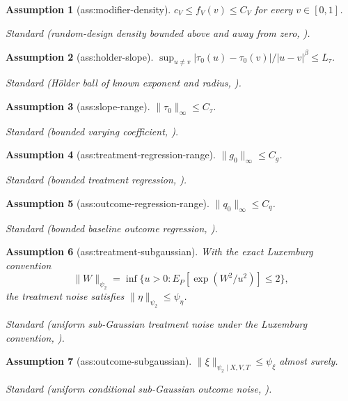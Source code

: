 \documentclass{article}
\newtheorem{assumption}{Assumption}
\begin{document}
\begin{assumption}[ass:modifier-density]\label{ass:modifier-density}
\(c_V\le f_V(v)\le C_V\) for every \(v\in[0,1]\).
\par\smallskip\noindent\emph{Standard} (random-design density bounded above and away from zero, \cite{LeeOkuiWhang2017}).
\end{assumption}

\begin{assumption}[ass:holder-slope]\label{ass:holder-slope}
\(\sup_{u\ne v}|\tau_0(u)-\tau_0(v)|/|u-v|^\beta\le L_\tau\).
\par\smallskip\noindent\emph{Standard} (Hölder ball of known exponent and radius, \cite{Low1997}).
\end{assumption}

\begin{assumption}[ass:slope-range]\label{ass:slope-range}
\(\|\tau_0\|_\infty\le C_\tau\).
\par\smallskip\noindent\emph{Standard} (bounded varying coefficient, \cite{FanZhang2000}).
\end{assumption}

\begin{assumption}[ass:treatment-regression-range]\label{ass:treatment-regression-range}
\(\|g_0\|_\infty\le C_g\).
\par\smallskip\noindent\emph{Standard} (bounded treatment regression, \cite{JinMackeySyrgkanis2025}).
\end{assumption}

\begin{assumption}[ass:outcome-regression-range]\label{ass:outcome-regression-range}
\(\|q_0\|_\infty\le C_q\).
\par\smallskip\noindent\emph{Standard} (bounded baseline outcome regression, \cite{JinMackeySyrgkanis2025}).
\end{assumption}

\begin{assumption}[ass:treatment-subgaussian]\label{ass:treatment-subgaussian}
With the exact Luxemburg convention
\[
 \lVert W\rVert_{\psi_2}
 =\inf\{u>0:E_P[\exp(W^2/u^2)]\le2\},
\]
the treatment noise satisfies \(\lVert\eta\rVert_{\psi_2}\le\psi_{\eta}\).
\par\smallskip\noindent\emph{Standard} (uniform sub-Gaussian treatment noise under the Luxemburg convention, \cite{JinMackeySyrgkanis2025}).
\end{assumption}

\begin{assumption}[ass:outcome-subgaussian]\label{ass:outcome-subgaussian}
\(\|\xi\|_{\psi_2\mid X,V,T}\le\psi_\xi\) almost surely.
\par\smallskip\noindent\emph{Standard} (uniform conditional sub-Gaussian outcome noise, \cite{JinMackeySyrgkanis2025}).
\end{assumption}
\end{document}
